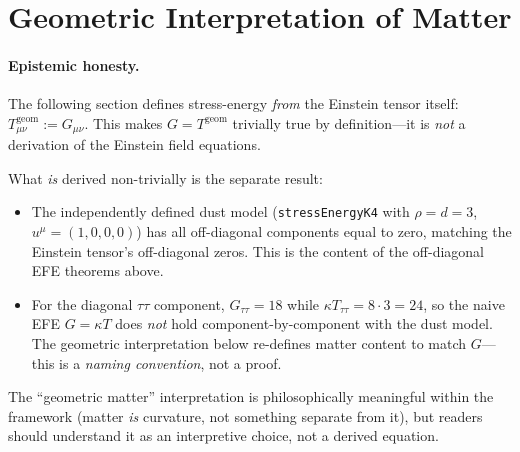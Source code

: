 \documentclass[11pt,a4paper]{book}
\begin{document}
\section{Geometric Interpretation of Matter}

\paragraph{Epistemic honesty.}
The following section defines stress-energy \emph{from} the Einstein tensor itself:
$T^{\text{geom}}_{\mu\nu} := G_{\mu\nu}$. This makes $G = T^{\text{geom}}$ trivially
true by definition---it is \emph{not} a derivation of the Einstein field equations.

What \emph{is} derived non-trivially is the separate result:
\begin{itemize}
\item The independently defined dust model (\texttt{stressEnergyK4} with $\rho = d = 3$,
  $u^\mu = (1,0,0,0)$) has all off-diagonal components equal to zero,
  matching the Einstein tensor's off-diagonal zeros. This is the content of
  the off-diagonal EFE theorems above.
\item For the diagonal $\tau\tau$ component, $G_{\tau\tau} = 18$ while
  $\kappa T_{\tau\tau} = 8 \cdot 3 = 24$, so the naive EFE $G = \kappa T$
  does \emph{not} hold component-by-component with the dust model.
  The geometric interpretation below re-defines matter content to match
  $G$---this is a \emph{naming convention}, not a proof.
\end{itemize}

The ``geometric matter'' interpretation is philosophically meaningful within the
framework (matter \emph{is} curvature, not something separate from it), but
readers should understand it as an interpretive choice, not a derived equation.
\end{document}
